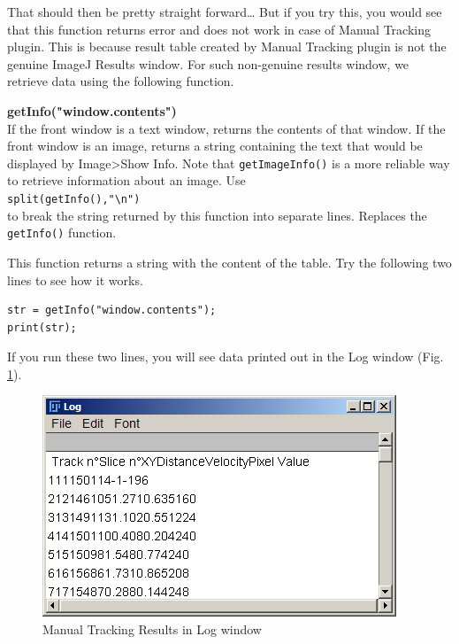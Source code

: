 \documentclass[11pt,a4paper,oneside]{report}
\newenvironment{indentCom}%
{\begin{list}{}%
         {\setlength{\leftmargin}{1em}}%
         \item[]%
}
{\end{list}}
\newcommand{\ilcom}[1]{\texttt{\small#1}}
\begin{document}
That should then be pretty straight forward\ldots 
But if you try this, you would see that this function returns error and 
does not work in case of Manual Tracking plugin. 
This is because result table created by Manual Tracking plugin is not the genuine ImageJ Results window. 
For such non-genuine results window, we retrieve data using the following function. 
\begin{indentCom}
\textbf{getInfo("window.contents")}\\
If the front window is a text window, returns the contents of that window. 
If the front window is an image, returns a string containing the text that would be displayed by 
Image>Show Info. Note that \ilcom{getImageInfo()} is a more reliable way to retrieve information 
about an image. Use \\
\ilcom{split(getInfo(),"\textbackslash{}n")} \\
to break the string returned by this function into separate lines. Replaces the \ilcom{getInfo()} function.
\end{indentCom}

This function returns a string with the content of the table. 
Try the following two lines to see how it works. \\

\begin{lstlisting}[numbers=none, morekeywords={*, getInfo}]
str = getInfo("window.contents");
print(str);
\end{lstlisting}
If you run these two lines, you will see data printed out in the Log window 
(Fig. \ref{fig:manualtrackingresultsLog}). 
\begin{figure}[htbp]
\begin{center}
\includegraphics[scale=0.6]{fig/fig253_AllValuesinLog.png}
\caption{Manual Tracking Results in Log window}
\label{fig:manualtrackingresultsLog}
\end{center}
\end{figure}
\end{document}
